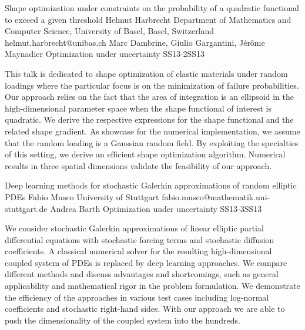 \begin{talk}
  {Shape optimization under constraints on the probability of a quadratic functional to exceed a given threshold}%
  {Helmut Harbrecht}%
  {Department of Mathematics and Computer Science, University of Basel, Basel, Switzerland}%
  {helmut.harbrecht@unibas.ch}%
  {Marc Dambrine, Giulio Gargantini, J\'er\^{o}me Maynadier}%
{Optimization under uncertainty}
{}{SS13-2}{SS13}

			
This talk is dedicated to shape optimization of elastic materials 
under random loadings where the particular focus is on the 
minimization of failure probabilities. Our approach relies on the 
fact that the area of integration is an ellipsoid in the high-dimensional
parameter space when the shape functional of interest is quadratic.
We derive the respective expressions for the shape functional and the 
related shape gradient. As showcase for the numerical implementation, 
we assume that the random loading is a Gaussian random field. By 
exploiting the specialties of this setting, we derive an efficient shape
optimization algorithm. Numerical results in three spatial dimensions 
validate the feasibility of our approach.
\end{talk}

\begin{talk}
  {Deep learning methods for stochastic Galerkin approximations of random elliptic PDEs}%
  {Fabio Musco}%
  {University of Stuttgart}%
  {fabio.musco@mathematik.uni-stuttgart.de}%
  {Andrea Barth}%
{Optimization under uncertainty}
{}{SS13-3}{SS13}

			
We consider stochastic Galerkin approximations of linear elliptic partial differential equations with stochastic forcing terms and stochastic diffusion coefficients. A classical numerical solver for the resulting high-dimensional coupled system of PDEs is replaced by deep learning approaches. We compare different methods and discuss advantages and shortcomings, such as general applicability and mathematical rigor in the problem formulation. We demonstrate the efficiency of the approaches in various test cases including log-normal coefficients and stochastic right-hand sides. With our approach we are able to push the dimensionality of the coupled system into the hundreds.

\end{talk}

